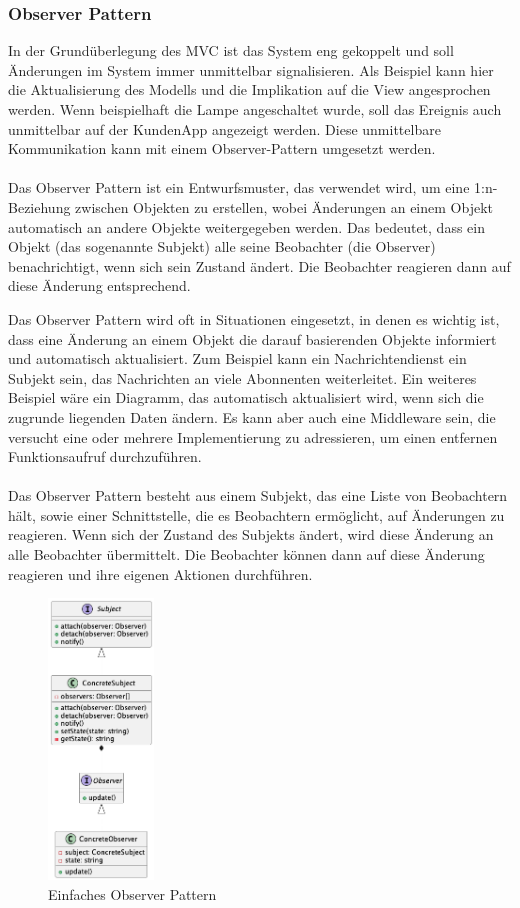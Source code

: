 \documentclass[../vs-script-first-v01.tex]{subfiles}
\begin{document}
\subsubsection{Observer Pattern}
In der Grundüberlegung des MVC ist das System eng gekoppelt und soll Änderungen im System immer unmittelbar signalisieren. Als Beispiel kann hier die Aktualisierung des Modells und die Implikation auf die View angesprochen werden. 
Wenn beispielhaft die Lampe angeschaltet wurde, soll das Ereignis auch unmittelbar auf der KundenApp angezeigt werden. 
Diese unmittelbare Kommunikation kann mit einem Observer-Pattern umgesetzt werden. 
\\\\
Das Observer Pattern ist ein Entwurfsmuster, das verwendet wird, um eine 1:n-Beziehung zwischen Objekten zu erstellen, wobei Änderungen an einem Objekt automatisch an andere Objekte weitergegeben werden. Das bedeutet, dass ein Objekt (das sogenannte Subjekt) alle seine Beobachter (die Observer) benachrichtigt, wenn sich sein Zustand ändert. Die Beobachter reagieren dann auf diese Änderung entsprechend.

Das Observer Pattern wird oft in Situationen eingesetzt, in denen es wichtig ist, dass eine Änderung an einem Objekt die darauf basierenden Objekte informiert und automatisch aktualisiert. Zum Beispiel kann ein Nachrichtendienst ein Subjekt sein, das Nachrichten an viele Abonnenten weiterleitet. Ein weiteres Beispiel wäre ein Diagramm, das automatisch aktualisiert wird, wenn sich die zugrunde liegenden Daten ändern. Es kann aber auch eine Middleware sein, die versucht eine oder mehrere Implementierung zu adressieren, um einen entfernen Funktionsaufruf durchzuführen. 
\\\\
Das Observer Pattern besteht aus einem Subjekt, das eine Liste von Beobachtern hält, sowie einer Schnittstelle, die es Beobachtern ermöglicht, auf Änderungen zu reagieren. Wenn sich der Zustand des Subjekts ändert, wird diese Änderung an alle Beobachter übermittelt. Die Beobachter können dann auf diese Änderung reagieren und ihre eigenen Aktionen durchführen.
\begin{figure}[ht]
  \centering
  \includegraphics[width=0.25\textwidth]{fig/uml/default-observer.png}
  \caption{Einfaches Observer Pattern}
  \label{fig:default-observer}
\end{figure}
\end{document}
